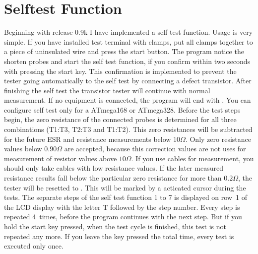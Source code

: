 
\section{Selftest Function}
\label{sec:selftest}
Beginning with release 0.9k I have implemented a self test function. Usage is very simple.
If you have installed  test terminal with clamps, put all clamps together to a piece of uninsulated wire and press the start button.
The program notice the shorten probes and start the self test function, if you confirm within two
seconds with pressing the start key. This confirmation is implemented to prevent the tester
going automatically to the self test by connecting a defect transistor.
After finishing the self test the transistor tester will continue with normal measurement.
If no equipment is connected, the program will end with . 
You can configure self test only for a ATmega168  or ATmega328.
Before the test steps begin, the zero resistance of the connected probes is determined for all three combinations
(T1:T3, T2:T3 and T1:T2).
This zero resistances will be subtracted for the future ESR and resistance measurements below \(10\Omega\).
Only zero resistance values below \(0.90\Omega\) are accepted, because this correction values are not
uses for measurement of resistor values above \(10\Omega\).
If you use cables for measurement, you should only take cables with low resistance values.
If the later measured resistance results fall below the particular zero resistance for more than \(0.2\Omega\),
the tester will be resetted to .
This will be marked by a acticated cursor during the tests.
The separate steps of the self test function 1 to 7 is displayed on row~1 of the LCD display with the letter T
followed by the step number.
Every step is repeated 4~times, before the program continues with the next step.
But if you hold the start key pressed, when the test cycle is finished, this test is not repeated any more.
If you leave the key pressed the total time, every test is executed only once.

